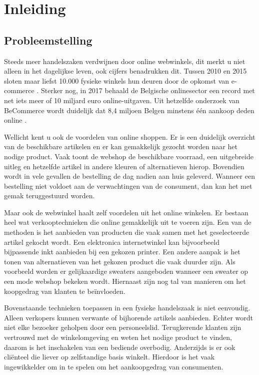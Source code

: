 
\chapter{Inleiding}
\label{ch:inleiding}

\section{Probleemstelling}
\label{sec:probleemstelling}

Steeds meer handelszaken verdwijnen door online webwinkels, dit merkt u niet alleen in het dagelijkse leven, ook cijfers benadrukken dit. Tussen 2010 en 2015 sloten maar liefst 10.000 fysieke winkels hun deuren door de opkomst van e-commerce \autocite{knack}.
Sterker nog, in 2017 behaald de Belgische onlinesector een record met net iets meer of 10 miljard euro online-uitgaven. Uit hetzelfde onderzoek van BeCommerce wordt duidelijk dat 8,4 miljoen Belgen minstens één aankoop deden online \autocite{becommerce}.

Wellicht kent u ook de voordelen van online shoppen. Er is een duidelijk overzicht van de beschikbare artikelen en er kan gemakkelijk gezocht worden naar het nodige product. Vaak toont de webshop de beschikbare voorraad, een uitgebreide uitleg en hetzelfde artikel in andere kleuren of alternatieven hierop. Bovendien wordt in vele gevallen de bestelling de dag nadien aan huis geleverd. Wanneer een bestelling niet voldoet aan de verwachtingen van de consument, dan kan het met gemak teruggestuurd worden. 

Maar ook de webwinkel haalt zelf voordelen uit het online winkelen. Er bestaan heel wat verkooptechnieken die online gemakkelijk uit te voeren zijn. Een van de methoden is het aanbieden van producten die vaak samen met het geselecteerde artikel gekocht wordt. Een elektronica internetwinkel kan bijvoorbeeld bijpassende inkt aanbieden bij een gekozen printer. Een andere aanpak is het tonen van alternatieven van het gekozen product die vaak duurder zijn. Als voorbeeld worden er gelijkaardige sweaters aangeboden wanneer een sweater op een mode webshop bekeken wordt. Hiernaast zijn nog tal van manieren om het koopgedrag van klanten te beïnvloeden. 

Bovenstaande technieken toepassen in een fysieke handelszaak is niet eenvoudig. Alleen verkopers kunnen verwante of bijhorende artikels aanbieden. Echter wordt niet elke bezoeker geholpen door een personeelslid. Terugkerende klanten zijn vertrouwd met de winkelomgeving en weten het nodige product te vinden, daarom is het inschakelen van een bediende overbodig. Anderzijds is er ook cliënteel die liever op zelfstandige basis winkelt. Hierdoor is het vaak ingewikkelder om in te spelen om het aankoopgedrag van consumenten.

